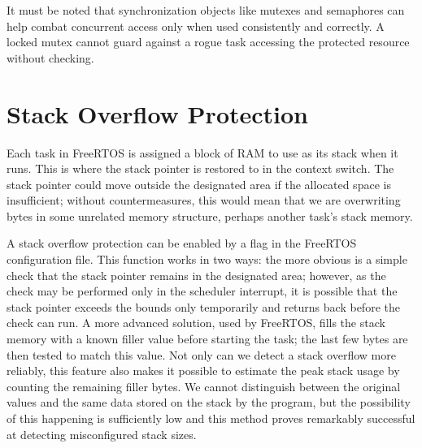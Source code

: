 It must be noted that synchronization objects like mutexes and semaphores can help combat concurrent access only when used consistently and correctly. A locked mutex cannot guard against a rogue task accessing the protected resource without checking.

\section{Stack Overflow Protection} \label{sec:stackprot}

Each task in FreeRTOS is assigned a block of \gls{RAM} to use as its stack when it runs. This is where the stack pointer is restored to in the context switch. The stack pointer could move outside the designated area if the allocated space is insufficient; without countermeasures, this would mean that we are overwriting bytes in some unrelated memory structure, perhaps another task's stack memory.

A stack overflow protection can be enabled by a flag in the FreeRTOS configuration file. This function works in two ways: the more obvious is a simple check that the stack pointer remains in the designated area; however, as the check may be performed only in the scheduler interrupt, it is possible that the stack pointer exceeds the bounds only temporarily and returns back before the check can run. A more advanced solution, used by FreeRTOS, fills the stack memory with a known filler value before starting the task; the last few bytes are then tested to match this value. Not only can we detect a stack overflow more reliably, this feature also makes it possible to estimate the peak stack usage by counting the remaining filler bytes. We cannot distinguish between the original values and the same data stored on the stack by the program, but the possibility of this happening is sufficiently low and this method proves remarkably successful at detecting misconfigured stack sizes.

